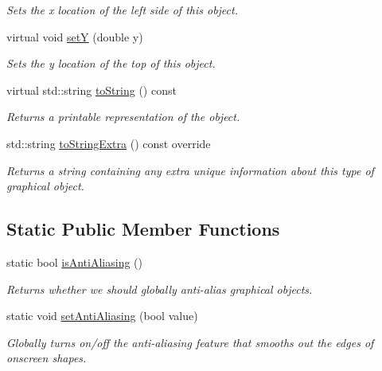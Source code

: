 \begin{DoxyCompactItemize}
\begin{DoxyCompactList}\small\item\em Sets the x location of the left side of this object. \end{DoxyCompactList}\item 
virtual void \mbox{\hyperlink{classsgl_1_1GObject_a7d57e2a5c35d27feb58fd498a3cf82b9}{setY}} (double y)
\begin{DoxyCompactList}\small\item\em Sets the y location of the top of this object. \end{DoxyCompactList}\item 
virtual std\+::string \mbox{\hyperlink{classsgl_1_1GObject_a1fe5121d6528fdea3f243321b3fa3a49}{to\+String}} () const
\begin{DoxyCompactList}\small\item\em Returns a printable representation of the object. \end{DoxyCompactList}\item 
std\+::string \mbox{\hyperlink{classsgl_1_1GText_a04364e674911906702b748deec32db18}{to\+String\+Extra}} () const override
\begin{DoxyCompactList}\small\item\em Returns a string containing any extra unique information about this type of graphical object. \end{DoxyCompactList}\end{DoxyCompactItemize}
\subsection*{Static Public Member Functions}
\begin{DoxyCompactItemize}
\item 
static bool \mbox{\hyperlink{classsgl_1_1GObject_a93be0e1fe1b1bf1a1da732470c94f42b}{is\+Anti\+Aliasing}} ()
\begin{DoxyCompactList}\small\item\em Returns whether we should globally anti-\/alias graphical objects. \end{DoxyCompactList}\item 
static void \mbox{\hyperlink{classsgl_1_1GObject_a1e43371668ae850193cebedb44e1bbe3}{set\+Anti\+Aliasing}} (bool value)
\begin{DoxyCompactList}\small\item\em Globally turns on/off the anti-\/aliasing feature that smooths out the edges of onscreen shapes. \end{DoxyCompactList}\end{DoxyCompactItemize}
